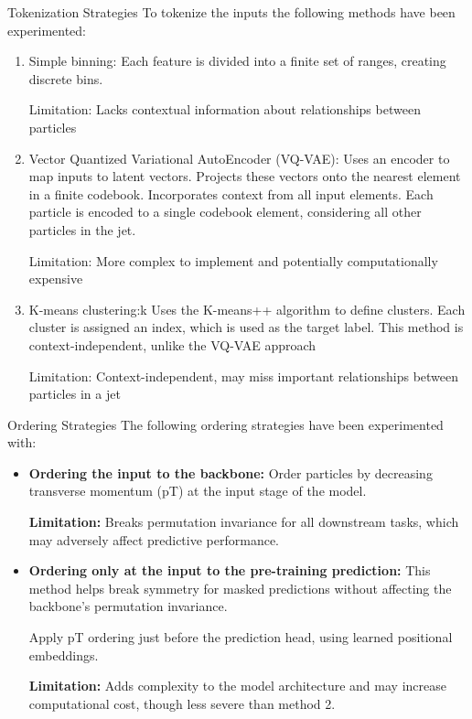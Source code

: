 \documentclass[10pt]{beamer}
\begin{document}
\begin{frame}{Tokenization Strategies}
    To tokenize the inputs the following methods have been experimented:
    \begin{enumerate}[<+->]
        \item Simple binning:
            Each feature is divided into a finite set of ranges, creating
            discrete bins.

            Limitation: Lacks contextual information about relationships between
            particles


        \item Vector Quantized Variational AutoEncoder (VQ-VAE):
            Uses an encoder to map inputs to latent vectors.
            Projects these vectors onto the nearest element in a finite
            codebook.
            Incorporates context from all input elements.
            Each particle is encoded to a single codebook element, considering
            all other particles in the jet.

            Limitation: More complex to implement and potentially
            computationally expensive


        \item K-means clustering:k
            Uses the K-means++ algorithm to define clusters.
            Each cluster is assigned an index, which is used as the target
            label.
            This method is context-independent, unlike the VQ-VAE approach

            Limitation: Context-independent, may miss important relationships
            between particles in a jet
    \end{enumerate}
\end{frame}

\begin{frame}{Ordering Strategies}
    The following ordering strategies have been experimented with:
    \begin{itemize}[<+->]
        \item \textbf{Ordering the input to the backbone:}
            Order particles by decreasing transverse momentum (pT) at
            the input stage of the model.

            \textbf{Limitation:} Breaks permutation invariance for all downstream tasks,
            which may adversely affect predictive performance.
        \item \textbf{Ordering only at the input to the pre-training prediction:}
            This method helps break symmetry for masked predictions without affecting the
            backbone's permutation invariance.

            Apply pT ordering just before the prediction head, using
            learned positional embeddings.

            \textbf{Limitation:} Adds complexity to the model architecture and may
            increase computational cost, though less severe than method 2.

    \end{itemize}
\end{frame}
\end{document}
